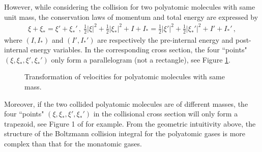 \documentclass[reqno,11pt]{amsart}
\numberwithin{equation}{section}
\begin{document}
However, while considering the collision for two polyatomic molecules with same unit mass, the conservation laws of momentum and total energy are expressed by
\begin{equation*}
	\begin{aligned}
		\xi + \xi_* = \xi' + \xi_*' \,, \ \tfrac{1}{2} |\xi|^2 + \tfrac{1}{2} |\xi_*|^2 + I + I_* = \tfrac{1}{2} |\xi'|^2 + \tfrac{1}{2} |\xi_*'|^2 + I' + I_*' \,,
	\end{aligned}
\end{equation*}
where $(I, I_*)$ and $(I', I_*')$ are respectively the pre-internal energy and post-internal energy variables. In the corresponding cross section, the four ``points" $(\xi, \xi_*, \xi', \xi_*')$ only form a parallelogram (not a rectangle), see Figure \ref{Fig2}.
\begin{figure}[h]
	\begin{center}
	\end{center}
	\caption{Transformation of velocities for polyatomic molecules with same mass.}\label{Fig2}
\end{figure}
Moreover, if the two collided polyatomic molecules are of different masses, the four ``points" $(\xi, \xi_*, \xi', \xi_*')$ in the collisional cross section will only form a trapezoid, see Figure 1 of \cite{N.Bernhoff-2023} for example. From the geometric intuitivity above, the structure of the Boltzmann collision integral for the polyatomic gases is more complex than that for the monatomic gases.
\end{document}
